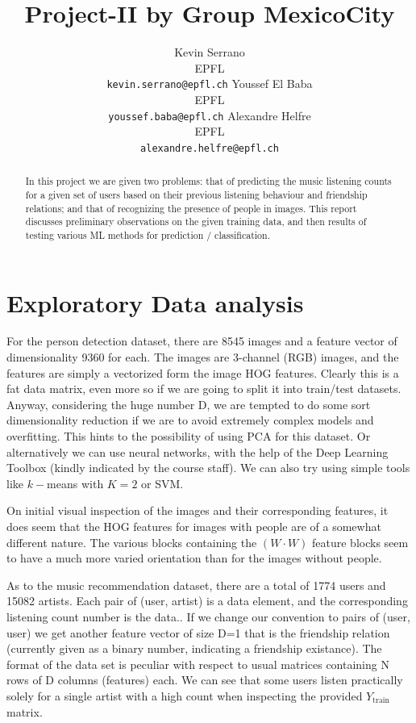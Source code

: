 \documentclass{article} %
\title{Project-II by Group MexicoCity}
\author{
Kevin Serrano\\EPFL\\
\texttt{kevin.serrano@epfl.ch} \And Youssef El Baba\\EPFL\\
\texttt{youssef.baba@epfl.ch} \And Alexandre Helfre\\EPFL\\
\texttt{alexandre.helfre@epfl.ch}
}
\begin{document}
\maketitle

\begin{abstract}
In this project we are given two problems: that of predicting the music listening counts for a given set of users based on their previous listening behaviour and friendship relations; and that of recognizing the presence of people in images. This report discusses preliminary observations on the given training data, and then results of testing various ML methods for prediction / classification.
\end{abstract}

\section{Exploratory Data analysis}
\label{sec:datadescr}
For the person detection dataset, there are 8545 images and a feature vector of dimensionality 9360 for each. The images are 3-channel (RGB) images, and the features are simply a vectorized form the image HOG features. Clearly this is a fat data matrix, even more so if we are going to split it into train/test datasets. Anyway, considering the huge number D, we are tempted to do some sort dimensionality reduction if we are to avoid extremely complex models and overfitting. This hints to the possibility of using PCA for this dataset. Or alternatively we can use neural networks, with the help of the Deep Learning Toolbox (kindly indicated by the course staff). We can also try using simple tools like $k-$means with $K = 2$ or SVM.

On initial visual inspection of the images and their corresponding features, it does seem that the HOG features for images with people are of a somewhat different nature. The various blocks containing the $(W \cdot W)$ feature blocks seem to have a much more varied orientation than for the images without people.

As to the music recommendation dataset, there are a total of 1774 users and 15082 artists. Each pair of (user, artist) is a data element, and the corresponding listening count number is the data.. If we change our convention to pairs of (user, user) we get another feature vector of size D=1 that is the friendship relation (currently given as a binary number, indicating a friendship existance). The format of the data set is peculiar with respect to usual matrices containing N rows of D columns (features) each. We can see that some users listen practically solely for a single artist with a high count when inspecting the provided $Y_{\text{train}}$ matrix.
\end{document}
